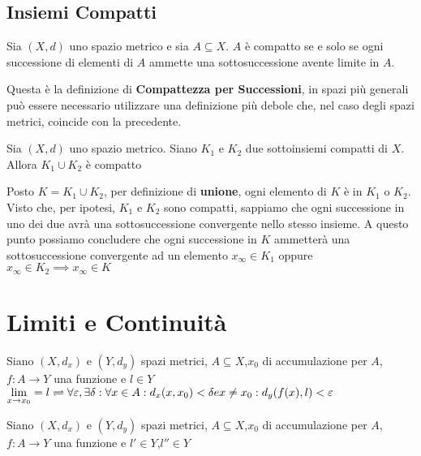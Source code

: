 \subsection{Insiemi Compatti}
\begin{definition}
	\label{def:compatto}
	Sia $(X,d)$ uno spazio metrico e sia $A \subseteq X$. $A$ è compatto se e solo se ogni successione di elementi di $A$ ammette una sottosuccessione avente limite in $A$.
	\begin{note}
		Questa è la definizione di \textbf{Compattezza per Successioni}, in spazi più generali può essere necessario utilizzare una definizione più debole che, nel caso degli spazi metrici, coincide con la precedente.
	\end{note}
\end{definition}
\begin{exercise}
	\label{ex:unione_compatti}
	Sia $(X,d)$ uno spazio metrico. Siano $K_1$ e $K_2$ due sottoinsiemi compatti di $X$. Allora $K_1 \cup K_2$ è compatto
	\begin{solution}
		Posto $K = K_1 \cup K_2$, per definizione di \textbf{unione}, ogni elemento di $K$ è in $K_1$ o $K_2$.
		Visto che, per ipotesi, $K_1$ e $K_2$ sono compatti, sappiamo che ogni successione in uno dei due avrà una sottosuccessione convergente nello stesso insieme. A questo punto possiamo concludere che ogni successione in $K$ ammetterà una sottosuccessione convergente ad un elemento $x_\infty \in K_1$ oppure $x_\infty \in K_2 \implies x_\infty \in K$
	\end{solution}
\end{exercise}
\begin{exercise}
	\label{ex:dist_eqiv}
\end{exercise}

\section{Limiti e Continuità}
\begin{definition}
	Siano $(X,d_x)$ e $(Y,d_y)$ spazi metrici, $A\subseteq{X}$,$x_0$ di accumulazione per $A$, $f:A\rightarrow{Y}$ una funzione e $l\in{Y}$ \\
	$\lim\limits_{x \rightarrow x_0} = l \rightleftharpoons \forall{\varepsilon},\exists\delta : \forall{x}\in A : d_x(x,x_0)<\delta e x\ne{x_0} : d_y(f(x),l)<\varepsilon$
\end{definition}

\begin{proposition}
	Siano $(X,d_x)$ e $(Y,d_y)$ spazi metrici, $A\subseteq{X}$,$x_0$ di accumulazione per $A$, $f:A\rightarrow{Y}$ una funzione e $l'\in{Y}$,$l''\in{Y}$
\end{proposition}

